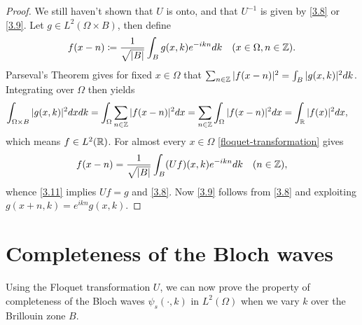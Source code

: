 \begin{theorem}
\begin{proof}
		We still haven't shown that $U$ is onto, and that $U^{-1}$ is given by \eqref{3.8} or \eqref{3.9}. Let $g \in L^{2}(\Omega \times B)$, then define
		\begin{equation}
			f(x - n) \coloneqq \frac{1}{\sqrt{|B|}} \int_{B} g(x, k) e^{-ikn} dk \quad (x \in \Omega, n \in\mathbb{Z}).\label{3.11}
		\end{equation}
		Parseval's Theorem gives for fixed $x \in \Omega$ that $\sum_{n \in \mathbb{Z}} |f(x - n)|^{2} = \int_{B} |g(x, k)|^{2} dk$. Integrating over $\Omega$ then yields
		\begin{align*}
			\int_{\Omega \times B} |g(x, k)|^{2} dx dk & = \int_{\Omega} \sum_{n \in \mathbb{Z}} |f(x - n)|^{2} dx  = \sum_{n \in\mathbb{Z}} \int_{\Omega} |f(x-n)|^{2} dx = \int_{\mathbb{R}} |f(x)|^{2} dx,	
		\end{align*}
		which means $f \in L^{2}(\mathbb{R})$. For almost every $x \in \Omega$ \eqref{floquet-transformation} gives
		\[ f(x - n) = \frac{1}{\sqrt{|B|}} \int_{B} (Uf)(x,k) e^{-ikn} dk \quad (n \in \mathbb{Z}), \]
		whence \eqref{3.11} implies $U f = g$ and \eqref{3.8}. Now \eqref{3.9} follows from \eqref{3.8} and exploiting $g(x + n, k) = e^{ikn} g(x, k)$.
	\end{proof}				
\end{theorem}

\section{Completeness of the Bloch waves}

Using the Floquet transformation $U$, we can now prove the property of completeness of the Bloch waves $\psi_{s}(\cdot, k)$ in $L^{2}(\Omega)$ when we vary $k$ over the Brillouin zone $B$. %
	
